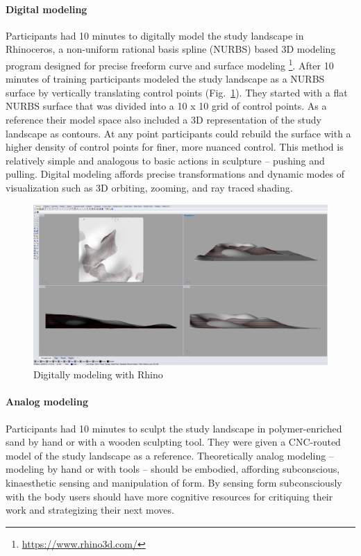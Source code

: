 \documentclass[prodmode,acmtochi]{acmsmall} %
\begin{document}
\paragraph{Digital modeling}
Participants had 10 minutes to digitally model the study landscape in Rhinoceros, 
a non-uniform rational basis spline (NURBS) based 3D modeling program
designed for precise freeform curve and surface modeling 
\footnote{\url{https://www.rhino3d.com/}}. 
%
After 10 minutes of training
participants modeled the study landscape as a NURBS surface 
by vertically translating control points (Fig.~\ref{fig:rhino}). 
%
They started with a flat NURBS surface that was divided into a 10 x 10 grid of control points.
%
As a reference their model space also included a 3D representation of the study landscape as contours. 
%
At any point participants could rebuild the surface with a higher density of control points for finer, more nuanced control. 
%
This method is relatively simple and 
analogous to basic actions in sculpture -- pushing and pulling. 
%
%
Digital modeling affords precise transformations and
dynamic modes of visualization such as 
3D orbiting, zooming, and ray traced shading. 

\begin{figure}[h!]
\begin{center}
		\includegraphics[width=\textwidth]{images/rhino.png}
	\caption{Digitally modeling with Rhino}
	\label{fig:rhino}
\end{center}
\end{figure}

\paragraph{Analog modeling} %
Participants had 10 minutes to sculpt the study landscape in polymer-enriched sand by hand or with a wooden sculpting tool. 
They were given a CNC-routed model of the study landscape as a reference. 
%
Theoretically analog modeling -- modeling by hand or with tools -- should be embodied, 
affording subconscious, kinaesthetic sensing and manipulation of form. 
%
By sensing form subconsciously with the body
users should have more cognitive resources for critiquing their work 
and strategizing their next moves. 
\end{document}

